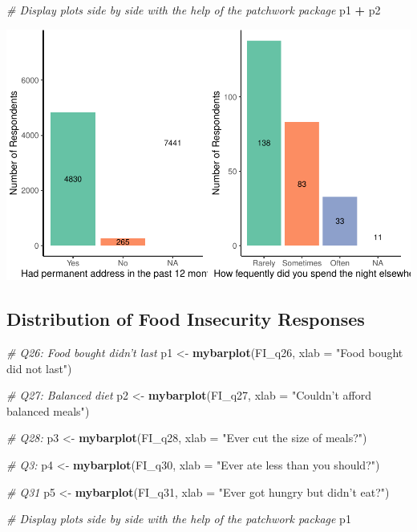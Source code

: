 \documentclass[
  10pt,
]{article}
\newenvironment{Shaded}{\begin{snugshade}}{\end{snugshade}}
\newcommand{\CommentTok}[1]{\textcolor[rgb]{0.56,0.35,0.01}{\textit{#1}}}
\newcommand{\DataTypeTok}[1]{\textcolor[rgb]{0.13,0.29,0.53}{#1}}
\newcommand{\KeywordTok}[1]{\textcolor[rgb]{0.13,0.29,0.53}{\textbf{#1}}}
\newcommand{\NormalTok}[1]{#1}
\newcommand{\OperatorTok}[1]{\textcolor[rgb]{0.81,0.36,0.00}{\textbf{#1}}}
\newcommand{\StringTok}[1]{\textcolor[rgb]{0.31,0.60,0.02}{#1}}
\begin{document}
\begin{Shaded}
\begin{Highlighting}[]
\CommentTok{# Display plots side by side with the help of the patchwork package}
\NormalTok{p1 }\OperatorTok{+}\StringTok{ }\NormalTok{p2}
\end{Highlighting}
\end{Shaded}

\includegraphics{phase1_report_files/figure-latex/unnamed-chunk-2-1}

\hypertarget{distribution-of-food-insecurity-responses}{%
\subsection{Distribution of Food Insecurity Responses}\label{distribution-of-food-insecurity-responses}}

\begin{Shaded}
\begin{Highlighting}[]
\CommentTok{# Q26: Food bought didn't last}
\NormalTok{p1 <-}\StringTok{ }\KeywordTok{mybarplot}\NormalTok{(FI_q26, }\DataTypeTok{xlab =} \StringTok{"Food bought did not last"}\NormalTok{)}

\CommentTok{# Q27: Balanced diet}
\NormalTok{p2 <-}\StringTok{ }\KeywordTok{mybarplot}\NormalTok{(FI_q27, }\DataTypeTok{xlab =} \StringTok{"Couldn't afford balanced meals"}\NormalTok{)}

\CommentTok{# Q28: }
\NormalTok{p3 <-}\StringTok{ }\KeywordTok{mybarplot}\NormalTok{(FI_q28, }\DataTypeTok{xlab =} \StringTok{"Ever cut the size of meals?"}\NormalTok{)}

\CommentTok{# Q3: }
\NormalTok{p4 <-}\StringTok{ }\KeywordTok{mybarplot}\NormalTok{(FI_q30, }\DataTypeTok{xlab =} \StringTok{"Ever ate less than you should?"}\NormalTok{)}

\CommentTok{# Q31}
\NormalTok{p5 <-}\StringTok{ }\KeywordTok{mybarplot}\NormalTok{(FI_q31, }\DataTypeTok{xlab =} \StringTok{"Ever got hungry but didn't eat?"}\NormalTok{)}

\CommentTok{# Display plots side by side with the help of the patchwork package}
\NormalTok{p1 }
\end{Highlighting}
\end{Shaded}
\end{document}

